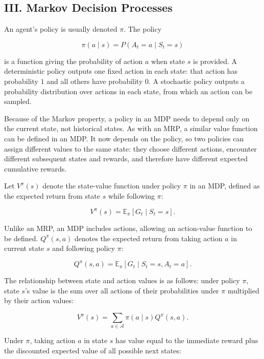 \hypertarget{iii.-markov-decision-processes}{%
\subsection{III. Markov Decision Processes}\label{iii.-markov-decision-processes}}

An agent's policy is usually denoted \(\pi\). The policy

\[
\pi(a\mid s)=P(A_t=a\mid S_t=s)
\]

is a function giving the probability of action \(a\) when state \(s\) is provided. A deterministic policy outputs one fixed action in each state: that action has probability \(1\) and all others have probability \(0\). A stochastic policy outputs a probability distribution over actions in each state, from which an action can be sampled.

Because of the Markov property, a policy in an MDP needs to depend only on the current state, not historical states. As with an MRP, a similar value function can be defined in an MDP. It now depends on the policy, so two policies can assign different values to the same state: they choose different actions, encounter different subsequent states and rewards, and therefore have different expected cumulative rewards.

Let \(V^{\pi}(s)\) denote the state-value function under policy \(\pi\) in an MDP, defined as the expected return from state \(s\) while following \(\pi\):

\[
V^{\pi}(s)=\mathbb{E}_{\pi}[G_t\mid S_t=s].
\]

Unlike an MRP, an MDP includes actions, allowing an action-value function to be defined. \(Q^{\pi}(s,a)\) denotes the expected return from taking action \(a\) in current state \(s\) and following policy \(\pi\):

\[
Q^{\pi}(s,a)=\mathbb{E}_{\pi}[G_t\mid S_t=s,A_t=a].
\]

The relationship between state and action values is as follows: under policy \(\pi\), state \(s\)'s value is the sum over all actions of their probabilities under \(\pi\) multiplied by their action values:

\[
V^{\pi}(s)=\sum_{a\in\mathcal{A}}\pi(a\mid s)Q^{\pi}(s,a).
\]

Under \(\pi\), taking action \(a\) in state \(s\) has value equal to the immediate reward plus the discounted expected value of all possible next states:

